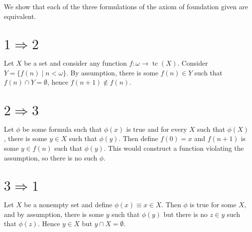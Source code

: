 \documentclass[12pt]{article}
\begin{document}
We show that each of the three formulations of the axiom of foundation given are equivalent.

\section*{$1\Rightarrow 2$}

Let $X$ be a set and consider any function $f:\omega\rightarrow \operatorname{tc}(X)$.  Consider $Y=\{f(n)\mid n<\omega\}$.  By assumption, there is some $f(n)\in Y$ such that $f(n)\cap Y=\emptyset$, hence $f(n+1)\notin f(n)$.

\section*{$2\Rightarrow 3$}

Let $\phi$ be some formula such that $\phi(x)$ is true and for every $X$ such that $\phi(X)$, there is some $y\in X$ such that $\phi(y)$.  Then define $f(0)=x$ and $f(n+1)$ is some $y\in f(n)$ such that $\phi(y)$.  This would construct a function violating the assumption, so there is no such $\phi$.

\section*{$3\Rightarrow1$}

Let $X$ be a nonempty set and define $\phi(x)\equiv x\in X$.  Then $\phi$ is true for some $X$, and by assumption, there is some $y$ such that $\phi(y)$ but there is no $z\in y$ such that $\phi(z)$.  Hence $y\in X$ but $y\cap X=\emptyset$.
\end{document}

